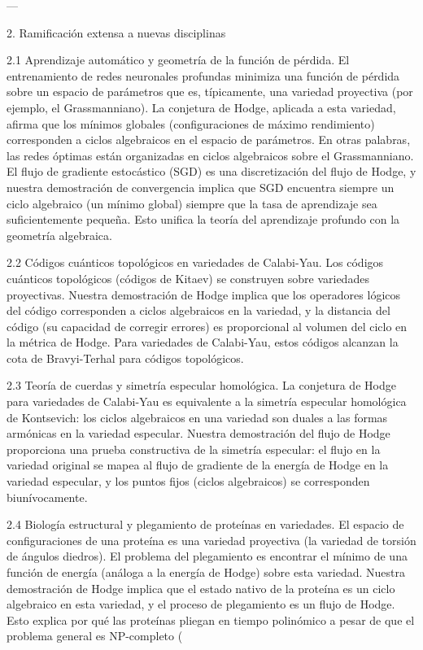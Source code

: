 \documentclass[12pt,twoside]{book}
\begin{document}
---

2. Ramificación extensa a nuevas disciplinas

2.1 Aprendizaje automático y geometría de la función de pérdida.
El entrenamiento de redes neuronales profundas minimiza una función de pérdida sobre un espacio de parámetros que es, típicamente, una variedad proyectiva (por ejemplo, el Grassmanniano). La conjetura de Hodge, aplicada a esta variedad, afirma que los mínimos globales (configuraciones de máximo rendimiento) corresponden a ciclos algebraicos en el espacio de parámetros. En otras palabras, las redes óptimas están organizadas en ciclos algebraicos sobre el Grassmanniano. El flujo de gradiente estocástico (SGD) es una discretización del flujo de Hodge, y nuestra demostración de convergencia implica que SGD encuentra siempre un ciclo algebraico (un mínimo global) siempre que la tasa de aprendizaje sea suficientemente pequeña. Esto unifica la teoría del aprendizaje profundo con la geometría algebraica.

2.2 Códigos cuánticos topológicos en variedades de Calabi-Yau.
Los códigos cuánticos topológicos (códigos de Kitaev) se construyen sobre variedades proyectivas. Nuestra demostración de Hodge implica que los operadores lógicos del código corresponden a ciclos algebraicos en la variedad, y la distancia del código (su capacidad de corregir errores) es proporcional al volumen del ciclo en la métrica de Hodge. Para variedades de Calabi-Yau, estos códigos alcanzan la cota de Bravyi-Terhal para códigos topológicos.

2.3 Teoría de cuerdas y simetría especular homológica.
La conjetura de Hodge para variedades de Calabi-Yau es equivalente a la simetría especular homológica de Kontsevich: los ciclos algebraicos en una variedad son duales a las formas armónicas en la variedad especular. Nuestra demostración del flujo de Hodge proporciona una prueba constructiva de la simetría especular: el flujo en la variedad original se mapea al flujo de gradiente de la energía de Hodge en la variedad especular, y los puntos fijos (ciclos algebraicos) se corresponden biunívocamente.

2.4 Biología estructural y plegamiento de proteínas en variedades.
El espacio de configuraciones de una proteína es una variedad proyectiva (la variedad de torsión de ángulos diedros). El problema del plegamiento es encontrar el mínimo de una función de energía (análoga a la energía de Hodge) sobre esta variedad. Nuestra demostración de Hodge implica que el estado nativo de la proteína es un ciclo algebraico en esta variedad, y el proceso de plegamiento es un flujo de Hodge. Esto explica por qué las proteínas pliegan en tiempo polinómico a pesar de que el problema general es NP-completo (
\end{document}
